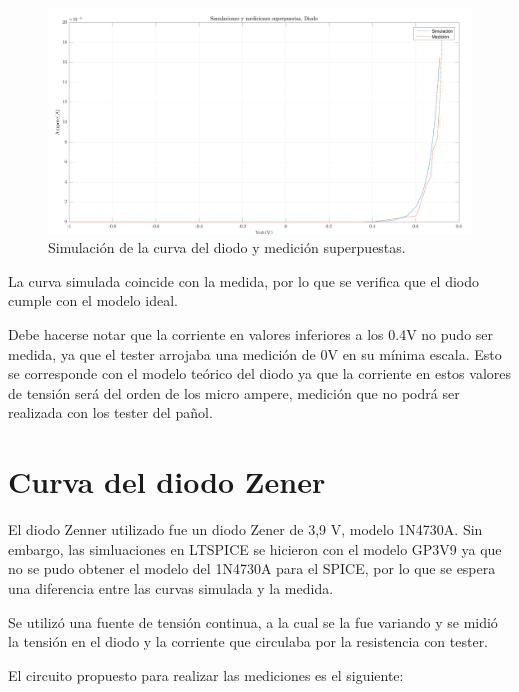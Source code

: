 \documentclass[../../e1_tp1_main.tex]{subfiles}
\begin{document}
\begin{figure}[H]	%
	\centering
	\includegraphics[scale=0.2]{imagenes/diodo_simulacion_medicion.png}
	\caption{Simulación de la curva del diodo y medición superpuestas.}
	\label{fig:ej5_diodo_simulacion_medicion}
\end{figure}

	La curva simulada coincide con la medida, por lo que se verifica que el diodo cumple con el modelo ideal.\par
	Debe hacerse notar que  la corriente en valores inferiores a los 0.4V no pudo ser medida, ya que el tester arrojaba una medición de 0V en su mínima escala. Esto se corresponde con el modelo teórico del diodo ya que la corriente en estos valores de tensión será del orden de los micro ampere, medición que no podrá ser realizada con los tester del pañol.\par

\section{Curva del diodo Zener}

	El diodo Zenner utilizado fue un diodo Zener de 3,9 V, modelo 1N4730A. Sin embargo, las simluaciones en LTSPICE se hicieron con el modelo GP3V9 ya que no se pudo obtener el modelo del 1N4730A para el SPICE, por lo que se espera una diferencia entre las curvas simulada y la medida.\par
	Se utilizó una fuente de tensión continua, a la cual se la fue variando y se midió la tensión en el diodo y la corriente que circulaba por la resistencia con tester.\par
	
	El circuito propuesto para realizar las mediciones es el siguiente:
	
\end{document}
